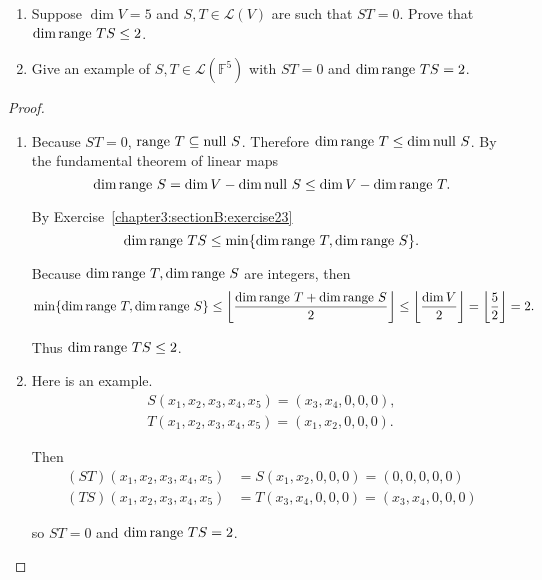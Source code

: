 \begin{exercise}
    \begin{enumerate}[label={(\alph*)}]
        \item Suppose $\dim V = 5$ and $S, T \in \mathcal{L}(V)$ are such that $ST = 0$. Prove that $\dim \operatorname{range}\,{TS} \leq 2$.
        \item Give an example of $S, T \in \mathcal{L}(\mathbb{F}^{5})$ with $ST = 0$ and $\dim\operatorname{range}\,{TS} = 2$.
    \end{enumerate}
\end{exercise}

\begin{proof}
    \begin{enumerate}[label={(\alph*)}]
        \item Because $ST = 0$, $\operatorname{range}\,{T}\subseteq \operatorname{null}\,{S}$. Therefore $\dim\operatorname{range}\,{T}\leq\dim\operatorname{null}\,{S}$. By the fundamental theorem of linear maps
              \[
                  \dim\operatorname{range}\,{S} = \dim V - \dim\operatorname{null}\,{S} \leq \dim V - \dim\operatorname{range}\,{T}.
              \]

              By Exercise~\ref{chapter3:sectionB:exercise23}
              \[
                  \dim\operatorname{range}\,{TS}\leq \min\{ \dim\operatorname{range}\,{T}, \dim\operatorname{range}\,{S} \}.
              \]

              Because $\dim\operatorname{range}\,{T}, \dim\operatorname{range}\,{S}$ are integers, then
              \[
                  \min\{ \dim\operatorname{range}\,{T}, \dim\operatorname{range}\,{S} \} \leq \left\lfloor\frac{\dim\operatorname{range}\,{T} + \dim\operatorname{range}\,{S}}{2}\right\rfloor \leq \left\lfloor\frac{\dim V}{2}\right\rfloor = \left\lfloor\frac{5}{2}\right\rfloor = 2.
              \]

              Thus $\dim\operatorname{range}\,{TS}\leq 2$.
        \item Here is an example.
              \[
                  \begin{split}
                      S(x_{1}, x_{2}, x_{3}, x_{4}, x_{5}) = (x_{3}, x_{4}, 0, 0, 0), \\
                      T(x_{1}, x_{2}, x_{3}, x_{4}, x_{5}) = (x_{1}, x_{2}, 0, 0, 0).
                  \end{split}
              \]

              Then
              \begin{align*}
                  (ST)(x_{1}, x_{2}, x_{3}, x_{4}, x_{5}) & = S(x_{1}, x_{2}, 0, 0, 0) = (0, 0, 0, 0, 0)         \\
                  (TS)(x_{1}, x_{2}, x_{3}, x_{4}, x_{5}) & = T(x_{3}, x_{4}, 0, 0, 0) = (x_{3}, x_{4}, 0, 0, 0)
              \end{align*}

              so $ST = 0$ and $\dim\operatorname{range}\,{TS} = 2$.
    \end{enumerate}
\end{proof}
\newpage

